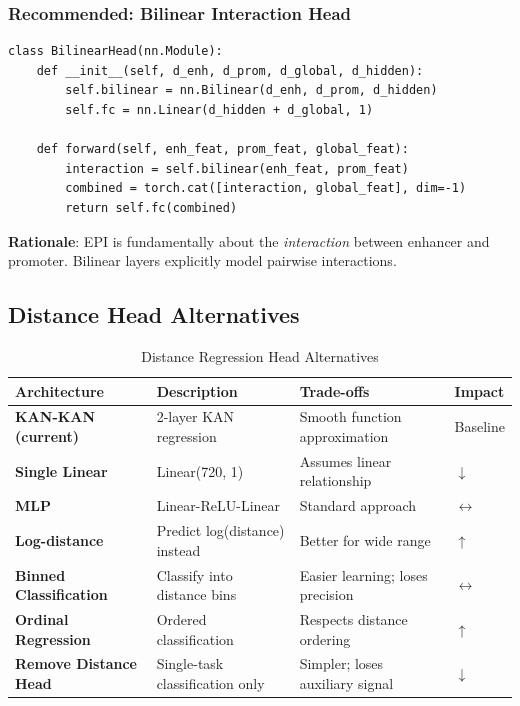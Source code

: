 \documentclass[11pt,a4paper]{article}
\begin{document}
\subsubsection{Recommended: Bilinear Interaction Head}

\begin{verbatim}
class BilinearHead(nn.Module):
    def __init__(self, d_enh, d_prom, d_global, d_hidden):
        self.bilinear = nn.Bilinear(d_enh, d_prom, d_hidden)
        self.fc = nn.Linear(d_hidden + d_global, 1)
    
    def forward(self, enh_feat, prom_feat, global_feat):
        interaction = self.bilinear(enh_feat, prom_feat)
        combined = torch.cat([interaction, global_feat], dim=-1)
        return self.fc(combined)
\end{verbatim}

\textbf{Rationale}: EPI is fundamentally about the \textit{interaction} between enhancer and promoter. Bilinear layers explicitly model pairwise interactions.

\subsection{Distance Head Alternatives}

\begin{longtable}{L{3cm}L{4cm}L{4cm}C{1.5cm}}
\caption{Distance Regression Head Alternatives} \\
\toprule
\textbf{Architecture} & \textbf{Description} & \textbf{Trade-offs} & \textbf{Impact} \\
\midrule
\endfirsthead
\bottomrule
\endlastfoot

\textbf{KAN-KAN (current)} & 2-layer KAN regression & Smooth function approximation & Baseline \\

\textbf{Single Linear} & Linear(720, 1) & Assumes linear relationship & \textcolor{negative}{$\downarrow$} \\

\textbf{MLP} & Linear-ReLU-Linear & Standard approach & \textcolor{neutral}{$\leftrightarrow$} \\

\textbf{Log-distance} & Predict log(distance) instead & Better for wide range & \textcolor{positive}{$\uparrow$} \\

\textbf{Binned Classification} & Classify into distance bins & Easier learning; loses precision & \textcolor{neutral}{$\leftrightarrow$} \\

\textbf{Ordinal Regression} & Ordered classification & Respects distance ordering & \textcolor{positive}{$\uparrow$} \\

\textbf{Remove Distance Head} & Single-task classification only & Simpler; loses auxiliary signal & \textcolor{negative}{$\downarrow$} \\

\end{longtable}
\end{document}
